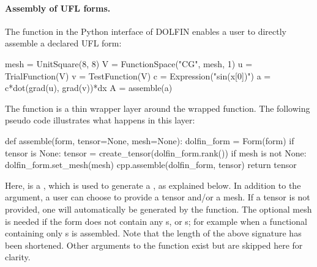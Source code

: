 \paragraph{Assembly of UFL forms.}

The  function in the Python interface of DOLFIN enables
a user to directly assemble a declared UFL form:
\begin{python}
mesh = UnitSquare(8, 8)
V = FunctionSpace("CG", mesh, 1)
u = TrialFunction(V)
v = TestFunction(V)
c = Expression("sin(x[0])")
a = c*dot(grad(u), grad(v))*dx
A = assemble(a)
\end{python}
The  function is a thin wrapper layer around the wrapped
 function. The following pseudo code illustrates what
happens in this layer:
\begin{python}
def assemble(form, tensor=None, mesh=None):
    dolfin_form = Form(form)
    if tensor is None:
        tensor = create_tensor(dolfin_form.rank())
    if mesh is not None:
        dolfin_form.set_mesh(mesh)
    cpp.assemble(dolfin_form, tensor)
    return tensor
\end{python}
Here,  is a , which is used to generate a
, as explained below. In addition to the 
argument, a user can choose to provide a tensor and/or a mesh. If a
tensor is not provided, one will automatically be generated by the
 function. The optional mesh is needed if the form
does not contain any s, or s; for example
when a functional containing only s is assembled. Note
that the length of the above signature has been shortened. Other
arguments to the  function exist but are skipped here
for clarity.

